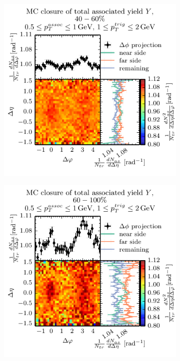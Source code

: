 \begin{figure}
\begin{subfigure}[b]{0.5\textwidth}
  \end{subfigure}
  \begin{subfigure}[b]{0.5\textwidth}
    \includegraphics[width=\textwidth]{figures/closure_structure_class_2.pdf}
  \end{subfigure}%
  \begin{subfigure}[b]{0.5\textwidth}
    \includegraphics[width=\textwidth]{figures/closure_structure_class_3.pdf}

\end{subfigure}
\end{figure}
